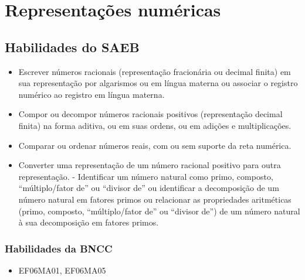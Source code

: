 \pagestyle{mat}
\chapter{Representações numéricas}

\section{Habilidades do SAEB}

\begin{itemize}
\item
  Escrever números racionais (representação fracionária ou decimal
  finita) em sua representação por algarismos ou em língua materna ou
  associar o registro numérico ao registro em língua materna.
\item
  Compor ou decompor números racionais positivos (representação decimal
  finita) na forma aditiva, ou em suas ordens, ou em adições e
  multiplicações.
\item
  Comparar ou ordenar números reais, com ou sem suporte da reta
  numérica.
\item
  Converter uma representação de um número racional positivo para outra
  representação. - Identificar um número natural como primo, composto,
  ``múltiplo/fator de'' ou ``divisor de'' ou identificar a decomposição
  de um número natural em fatores primos ou relacionar as propriedades
  aritméticas (primo, composto, ``múltiplo/fator de'' ou ``divisor de'')
  de um número natural à sua decomposição em fatores primos.
\end{itemize}

\subsection{Habilidades da BNCC}

\begin{itemize} 

  \item EF06MA01, EF06MA05

\end{itemize} 

